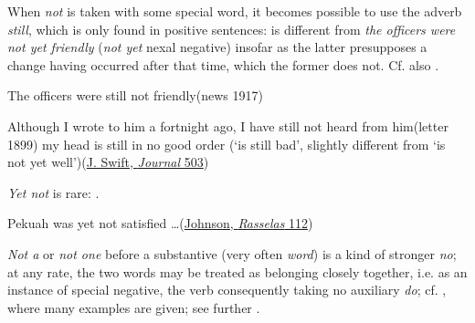 When \textit{not} is taken with some special word, it becomes possible to use the adverb \textit{still}, which is only found in positive sentences:  is different from \textit{the officers were not yet friendly} (\textit{not yet} nexal negative) insofar as the latter presupposes a change having occurred after that time, which the former does not. Cf. also .

\ea \label{ex:05-56}
The officers were still not friendly\hfill(news 1917) 
\z

\ea \label{ex:05-57}
\ea
Although I wrote to him a fortnight ago, I have still not heard from him\hfill(letter 1899)
\ex {}my head is still in no good order \phantom{x}(`is still bad', slightly different from `is not yet well')\hfill(\href{https://archive.org/details/journaltostellae00swifuoft/page/502/mode/2up?q=%22no+good+order%22&view=theater}{J. Swift, \textit{Journal} 503})
\z
\z

\textit{Yet not} is rare: .

\ea \label{ex:05-59}
Pekuah was yet not satisfied {\dots}\hfill(\href{https://archive.org/details/historyrasselas01johngoog/page/n117/mode/2up?q=%22was+yet+not+satisfied%22&view=theater}{Johnson, \textit{Rasselas} 112}) %
\z
{}

\label{para:kind-of-stronger-no}\textit{Not a} or \textit{not one} before a substantive (very often \textit{word}) is a kind of stronger \textit{no}; at any rate, the two words may be treated as belonging closely together, i.e. as an instance of special negative, the verb consequently taking no auxiliary \textit{do}; cf. \citet[\href{https://archive.org/details/jespersen-1954-a-modern-english-grammar-on-historical-principles-part-ii-syntax-first-volume/page/426/mode/2up?q=\%22not+one+word\%22&view=theater}{16.73}]{jespersenMEG2}, where many examples are given; see further .

